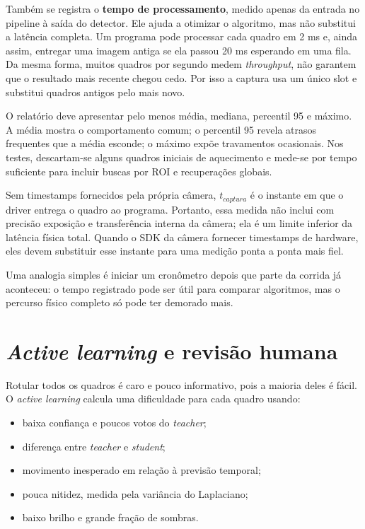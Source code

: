\documentclass[11pt,a4paper]{article}
\begin{document}
Também se registra o \textbf{tempo de processamento}, medido apenas da entrada no pipeline à
saída do detector. Ele ajuda a otimizar o algoritmo, mas não substitui a latência completa.
Um programa pode processar cada quadro em 2 ms e, ainda assim, entregar uma imagem antiga se
ela passou 20 ms esperando em uma fila. Da mesma forma, muitos quadros por segundo medem
\textit{throughput}, não garantem que o resultado mais recente chegou cedo. Por isso a captura usa
um único slot e substitui quadros antigos pelo mais novo.

O relatório deve apresentar pelo menos média, mediana, percentil 95 e máximo. A média mostra
o comportamento comum; o percentil 95 revela atrasos frequentes que a média esconde; o
máximo expõe travamentos ocasionais. Nos testes, descartam-se alguns quadros iniciais de
aquecimento e mede-se por tempo suficiente para incluir buscas por ROI e recuperações globais.

Sem timestamps fornecidos pela própria câmera, $t_{captura}$ é o instante em que o driver
entrega o quadro ao programa. Portanto, essa medida não inclui com precisão exposição e
transferência interna da câmera; ela é um limite inferior da latência física total. Quando o
SDK da câmera fornecer timestamps de hardware, eles devem substituir esse instante para uma
medição ponta a ponta mais fiel.

Uma analogia simples é iniciar um cronômetro depois que parte da corrida já aconteceu: o
tempo registrado pode ser útil para comparar algoritmos, mas o percurso físico completo só
pode ter demorado mais.

\section{\textit{Active learning} e revisão humana}

Rotular todos os quadros é caro e pouco informativo, pois a maioria deles é fácil. O
\textit{active learning} calcula uma dificuldade para cada quadro usando:

\begin{itemize}
  \item baixa confiança e poucos votos do \textit{teacher};
  \item diferença entre \textit{teacher} e \textit{student};
  \item movimento inesperado em relação à previsão temporal;
  \item pouca nitidez, medida pela variância do Laplaciano;
  \item baixo brilho e grande fração de sombras.
\end{itemize}
\end{document}
